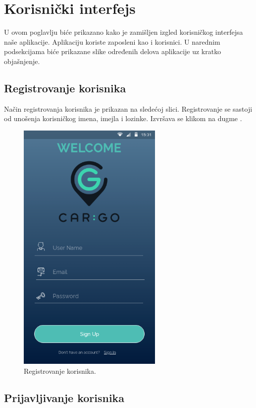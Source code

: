 ﻿\section{\bfseries Korisnički interfejs}

U ovom poglavlju biće prikazano kako je zamišljen izgled korisničkog interfejsa naše aplikacije. Aplikaciju koriste zaposleni kao i korisnici. U narednim podsekcijama biće prikazane slike određenih delova aplikacije uz kratko objašnjenje. 

\subsection{\bfseries Registrovanje korisnika}

Način registrovanja korisnika je prikazan na sledećoj slici. Registrovanje se sastoji od unošenja korisničkog imena, imejla i lozinke.  Izvršava se klikom na dugme .
\begin{figure}[H]
\begin{center}
\includegraphics[width=7cm]{Slike/Registrovanje.png}
\end{center}
    \caption{Registrovanje korisnika.}
\label{fig:Registrovanje korisnika}
\end{figure}

\newpage
\subsection{\bfseries Prijavljivanje korisnika}

